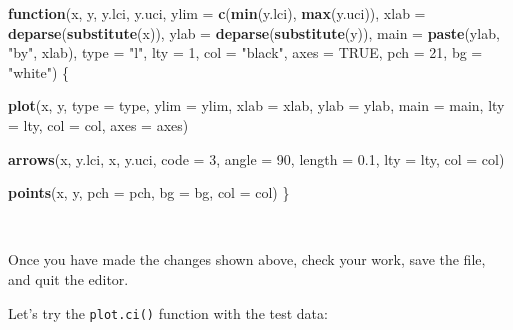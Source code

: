 \documentclass[12pt,a4paper]{book}
\newenvironment{Shaded}{\begin{snugshade}}{\end{snugshade}}
\newcommand{\ControlFlowTok}[1]{\textcolor[rgb]{0.13,0.29,0.53}{\textbf{#1}}}
\newcommand{\DataTypeTok}[1]{\textcolor[rgb]{0.13,0.29,0.53}{#1}}
\newcommand{\DecValTok}[1]{\textcolor[rgb]{0.00,0.00,0.81}{#1}}
\newcommand{\FloatTok}[1]{\textcolor[rgb]{0.00,0.00,0.81}{#1}}
\newcommand{\KeywordTok}[1]{\textcolor[rgb]{0.13,0.29,0.53}{\textbf{#1}}}
\newcommand{\NormalTok}[1]{#1}
\newcommand{\OperatorTok}[1]{\textcolor[rgb]{0.81,0.36,0.00}{\textbf{#1}}}
\newcommand{\OtherTok}[1]{\textcolor[rgb]{0.56,0.35,0.01}{#1}}
\newcommand{\StringTok}[1]{\textcolor[rgb]{0.31,0.60,0.02}{#1}}
\theoremstyle{definition}
\theoremstyle{definition}
\theoremstyle{definition}
\theoremstyle{remark}
\begin{document}
\begin{Shaded}
\begin{Highlighting}[]
\ControlFlowTok{function}\NormalTok{(x,}
\NormalTok{         y, y.lci, y.uci,}
         \DataTypeTok{ylim =} \KeywordTok{c}\NormalTok{(}\KeywordTok{min}\NormalTok{(y.lci), }\KeywordTok{max}\NormalTok{(y.uci)),}
         \DataTypeTok{xlab =} \KeywordTok{deparse}\NormalTok{(}\KeywordTok{substitute}\NormalTok{(x)),}
         \DataTypeTok{ylab =} \KeywordTok{deparse}\NormalTok{(}\KeywordTok{substitute}\NormalTok{(y)),}
         \DataTypeTok{main =} \KeywordTok{paste}\NormalTok{(ylab, }\StringTok{"by"}\NormalTok{, xlab),}
         \DataTypeTok{type =} \StringTok{"l"}\NormalTok{,}
         \DataTypeTok{lty =} \DecValTok{1}\NormalTok{,}
         \DataTypeTok{col =} \StringTok{"black"}\NormalTok{,}
         \DataTypeTok{axes =} \OtherTok{TRUE}\NormalTok{,}
         \DataTypeTok{pch =} \DecValTok{21}\NormalTok{,}
         \DataTypeTok{bg =} \StringTok{"white"}\NormalTok{) \{}

  \KeywordTok{plot}\NormalTok{(x, y, }\DataTypeTok{type =}\NormalTok{ type, }\DataTypeTok{ylim =}\NormalTok{ ylim, }\DataTypeTok{xlab =}\NormalTok{ xlab, }\DataTypeTok{ylab =}\NormalTok{ ylab,}
       \DataTypeTok{main =}\NormalTok{ main, }\DataTypeTok{lty =}\NormalTok{ lty, }\DataTypeTok{col =}\NormalTok{ col, }\DataTypeTok{axes =}\NormalTok{ axes)}
  
  \KeywordTok{arrows}\NormalTok{(x, y.lci, x, y.uci, }\DataTypeTok{code =} \DecValTok{3}\NormalTok{, }\DataTypeTok{angle =} \DecValTok{90}\NormalTok{, }\DataTypeTok{length =} \FloatTok{0.1}\NormalTok{,}
         \DataTypeTok{lty =}\NormalTok{ lty, }\DataTypeTok{col =}\NormalTok{ col)}
  
  \KeywordTok{points}\NormalTok{(x, y, }\DataTypeTok{pch =}\NormalTok{ pch, }\DataTypeTok{bg =}\NormalTok{ bg, }\DataTypeTok{col =}\NormalTok{ col)}
\NormalTok{\}}
\end{Highlighting}
\end{Shaded}

~

Once you have made the changes shown above, check your work, save the
file, and quit the editor.

\newpage

Let's try the \texttt{plot.ci()} function with the test data:

~

\begin{Shaded}
\end{Shaded}
\end{document}
